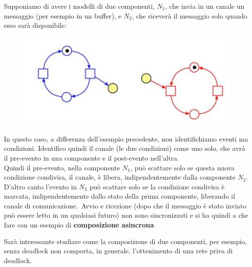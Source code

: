 \documentclass[a4paper,12pt, oneside]{book}
\begin{document}
\newpage
\begin{esempio}
  Supponiamo di avere i modelli di due componenti, $N_1$, che invia in un canale
  un messaggio (per esempio in un buffer), e $N_2$, che riceverà il messaggio
  solo quando esso sarà disponibile:
  \begin{figure}[H]
    \centering
    \includegraphics[scale = 0.5]{img/asinc.jpg} 
  \end{figure}
  In questo caso, a differenza dell'esempio precedente, non identifichiamo
  eventi ma condizioni. Identifico quindi il canale (le due condizioni) come uno
  solo, che avrà il pre-evento in una componente e il post-evento nell'altra.\\
  Quindi il pre-evento, nella componente $N_1$, può scattare solo se questa
  nuova condizione condivisa, il canale, è libera, indipendentemente dalla
  componente $N_2$. D'altro canto l'evento in $N_2$ può scattare solo se la
  condizione condivisa è marcata, indipendentemente dallo stato della prima
  componente, liberando il canale di comunicazione.\
  Avvio e ricezione (dopo che il messaggio è stato inviato può essere letto in
  un qualsiasi futuro) non sono sincronizzati e si ha quindi a che fare con
  un esempio di \textbf{composizione asincrona}
\end{esempio}
Sarà interessante studiare come la composizione di due componenti, per esempio,
senza deadlock non comporta, in generale, l'ottenimento di una rete priva di
deadlock.
\newpage
\end{document}

